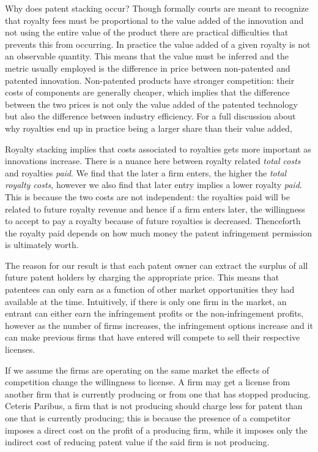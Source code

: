 \documentclass{article}
\begin{document}
Why does patent stacking occur? Though formally courts are meant to recognize that royalty fees must be proportional to the value added of the innovation and not using the entire value of the product there are practical difficulties that prevents this from occurring. In practice the value added of a given royalty is not an observable quantity. This means that the value must be inferred and the metric usually employed is the difference in price between non-patented and patented innovation. Non-patented products have stronger competition: their costs of components are generally cheaper, which implies that the difference between the two prices is not only the value added of the patented technology but also the difference between industry efficiency. For a full discussion about why royalties end up in practice being a larger share than their value added, \cite{Elhauge2008}

Royalty stacking implies that costs associated to royalties gets more important as innovations increase. There is a nuance here between royalty related \textit{total costs} and royalties \textit{paid}. We find that the later a firm enters, the higher the \textit{total royalty costs}, however we also find that later entry implies a lower royalty \textit{paid}. This is because the two costs are not independent: the royalties paid will be related to future royalty revenue and hence if a firm enters later, the willingness to accept to pay a royalty because of future royalties is decreased. Thenceforth the royalty paid depends on how much money the patent infringement permission is ultimately worth. 

The reason for our result is that each patent owner can extract the surplus of all future patent holders by charging the appropriate price. This means that patentees can only earn as a function of other market opportunities they had available at the time. Intuitively, if there is only one firm in the market, an entrant can either earn the infringement profits or the non-infringement profits, however as the number of firms increases, the infringement options increase and it can make previous firms that have entered will compete to sell their respective licenses.  

If we assume the firms are operating on the same market the effects of competition change the willingness to license. A firm may get a license from another firm that is currently producing or from one that has stopped producing. Ceteris Paribus, a firm that is not producing should charge less for patent than one that is currently producing; this is because the presence of a competitor imposes a direct cost on the profit of a producing firm, while it imposes only the indirect cost of reducing patent value if the said firm is not producing. 
\end{document}
